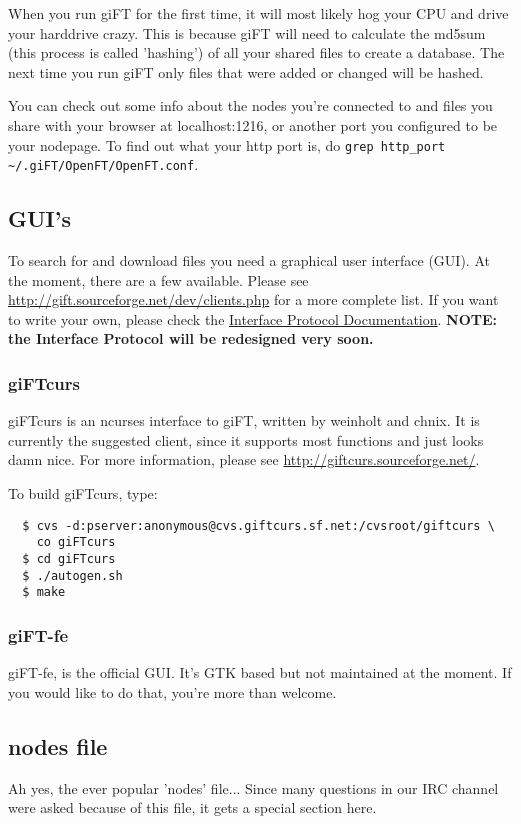 \documentclass[10pt]{article}
\begin{document}
When you run giFT for the first time, it will most likely hog your
CPU and drive your harddrive crazy. This is because giFT will need
to calculate the md5sum (this process is called 'hashing') of all
your shared files to create a database. The next time you run giFT
only files that were added or changed will be hashed.

You can check out some info about the nodes you're connected to
and files you share with your browser at localhost:1216, or
another port you configured to be your nodepage. To find out what
your http port is, do 
\verb|grep http_port ~/.giFT/OpenFT/OpenFT.conf|. 

\subsection{GUI's}
To search for and download files you need a graphical user
interface (GUI).  At the moment, there are a few available. Please
see \url{http://gift.sourceforge.net/dev/clients.php} for a more
complete list. If you want to write your own, please check the
\href{http://gift.sourceforge.net/docs/?document=interface.html}{Interface
Protocol Documentation}. \textbf{NOTE: the Interface Protocol will
be redesigned very soon.}

\subsubsection{giFTcurs}
giFTcurs is an ncurses interface to giFT, written by weinholt and
chnix.  It is currently the suggested client, since it supports
most functions and just looks damn nice. For more information,
please see \url{http://giftcurs.sourceforge.net/}. 

To build giFTcurs, type:

\begin{verbatim}
  $ cvs -d:pserver:anonymous@cvs.giftcurs.sf.net:/cvsroot/giftcurs \
    co giFTcurs
  $ cd giFTcurs
  $ ./autogen.sh
  $ make
\end{verbatim}

\subsubsection{giFT-fe}
giFT-fe, is the official GUI.  It's GTK based but not maintained
at the moment.  If you would like to do that,
you're more than welcome.

\subsection{nodes file}
Ah yes, the ever popular 'nodes' file... Since many questions in
our IRC channel were asked because of this file, it gets a special
section here.
 
\end{document}
